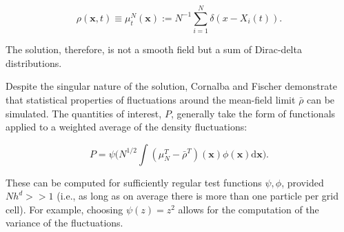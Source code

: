 \begin{equation*}
    \rho(\mathbf{x},t) \equiv \mu_t^N(\mathbf{x}) := N^{-1} \sum_{i=1}^N\delta(x - X_i(t)).
\end{equation*}

The solution, therefore, is not a smooth field but a sum 
of Dirac-delta distributions. 

Despite the singular nature of the solution, 
Cornalba and Fischer \cite{cornalba2025multilevel} demonstrate that
statistical properties of fluctuations 
around the mean-field limit $\bar{\rho}$ can be simulated. 
The quantities of interest, $P$, generally take the form of functionals applied 
to a weighted average of the density fluctuations:

\begin{equation} 
    P = \psi\big(N^{1/2} \int (\mu_N^T - \bar{\rho}^T)(\mathbf{x})
    \phi(\mathbf{x})\mathrm{d}\mathbf{x}\big).
\end{equation}

These can be computed
for sufficiently regular test functions $\psi, \phi$, provided $Nh^d >> 1$
(i.e., as long as on average there is more than one particle per grid cell).
For example, choosing $\psi(z) = z^2$ allows for the computation of the 
variance of the fluctuations.




